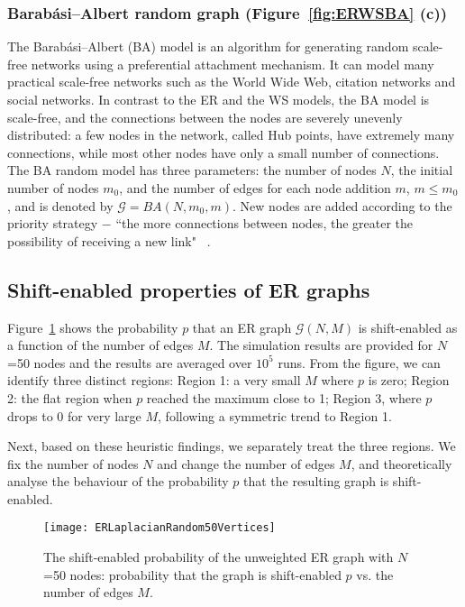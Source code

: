 \documentclass[journal]{IEEEtran}
\begin{document}
\subsubsection{Barabási–Albert random graph (Figure~\ref{fig:ERWSBA} (c))}
The Barabási–Albert (BA) model is an algorithm for generating random scale-free networks using a preferential attachment mechanism. It can model many practical scale-free networks 
such as the World Wide Web, citation networks and social networks. In contrast to the ER and the WS models, the BA model is scale-free, and the connections between the nodes are severely unevenly distributed: a few nodes in the network, called Hub points, have extremely many connections, while most other nodes have only a small number of connections. The
BA random model has three parameters: the number of nodes $N$, the initial number of nodes $m_0$, and the number of edges for each node addition $m$, $m\leq m_0$, and is denoted by $\mathcal{G}=BA(N,m_0, m)$. New nodes are added according to the priority strategy $-$ ``the more connections between nodes, the greater the possibility of receiving a new link" ~\cite{barabasi1999emergence,albert2002statistical,barabasi2013network}.

\subsection{%
Shift-enabled properties of ER graphs}\label{sec: ER graph}
 
Figure~\ref{fig:the shift-enabled probability of ER graphs} shows the probability $p$ that an ER graph $\mathcal{G}(N,M)$ is shift-enabled as a function of the number of edges $M$. The simulation results are provided for $N$=50 nodes and the results are averaged over $10^5$ runs. From the figure, we can identify three distinct regions: Region 1: a very small $M$ where $p$ is zero; Region 2: the flat region when $p$ reached the maximum close to 1; Region 3, where $p$ drops to 0 for very large $M$, following a symmetric trend to Region 1.

Next, based on these heuristic findings, we separately treat the three regions. We fix the number of nodes $N$ and change the number of edges $M$, and theoretically analyse the behaviour of the probability $p$ that the resulting graph is shift-enabled. 

\begin{figure}[htb]
	\centering
	\texttt{[image: ERLaplacianRandom50Vertices]}
	\caption{The shift-enabled probability of the unweighted ER graph with $N$=50 nodes: probability that the graph is shift-enabled $p$ vs. the number of edges $M$.}        \label{fig:the shift-enabled probability of ER graphs}
\end{figure}
\end{document}
